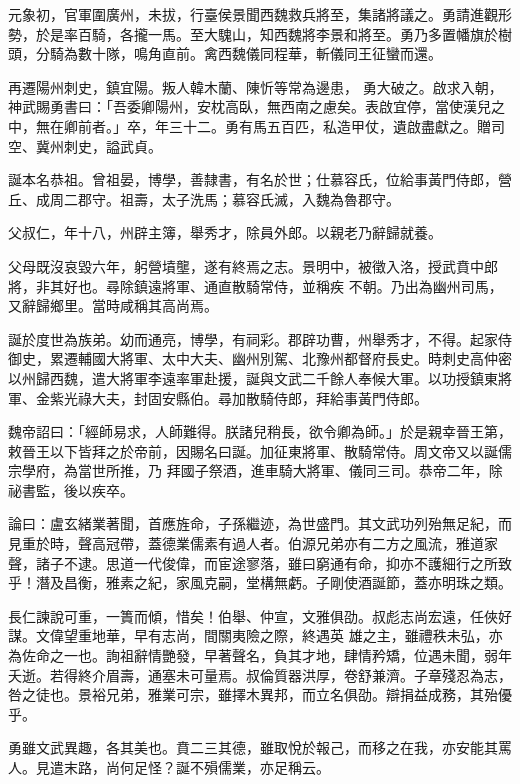 \begin{pinyinscope}
 元象初，官軍圍廣州，未拔，行臺侯景聞西魏救兵將至，集諸將議之。勇請進觀形勢，於是率百騎，各攏一馬。至大騩山，知西魏將李景和將至。勇乃多置幡旗於樹頭，分騎為數十隊，鳴角直前。禽西魏儀同程華，斬儀同王征蠻而還。



 再遷陽州刺史，鎮宜陽。叛人韓木蘭、陳忻等常為邊患，
 勇大破之。啟求入朝，神武賜勇書曰：「吾委卿陽州，安枕高臥，無西南之慮矣。表啟宜停，當使漢兒之中，無在卿前者。」卒，年三十二。勇有馬五百匹，私造甲仗，遺啟盡獻之。贈司空、冀州刺史，謚武貞。



 誕本名恭祖。曾祖晏，博學，善隸書，有名於世；仕慕容氏，位給事黃門侍郎，營丘、成周二郡守。祖壽，太子洗馬；慕容氏滅，入魏為魯郡守。



 父叔仁，年十八，州辟主簿，舉秀才，除員外郎。以親老乃辭歸就養。



 父母既沒哀毀六年，躬營墳壟，遂有終焉之志。景明中，被徵入洛，授武賁中郎將，非其好也。尋除鎮遠將軍、通直散騎常侍，並稱疾
 不朝。乃出為幽州司馬，又辭歸鄉里。當時咸稱其高尚焉。



 誕於度世為族弟。幼而通亮，博學，有祠彩。郡辟功曹，州舉秀才，不得。起家侍御史，累遷輔國大將軍、太中大夫、幽州別駕、北豫州都督府長史。時刺史高仲密以州歸西魏，遣大將軍李遠率軍赴援，誕與文武二千餘人奉候大軍。以功授鎮東將軍、金紫光祿大夫，封固安縣伯。尋加散騎侍郎，拜給事黃門侍郎。



 魏帝詔曰：「經師易求，人師難得。朕諸兒稍長，欲令卿為師。」於是親幸晉王第，敕晉王以下皆拜之於帝前，因賜名曰誕。加征東將軍、散騎常侍。周文帝又以誕儒宗學府，為當世所推，乃
 拜國子祭酒，進車騎大將軍、儀同三司。恭帝二年，除祕書監，後以疾卒。



 論曰：盧玄緒業著聞，首應旌命，子孫繼迹，為世盛門。其文武功列殆無足紀，而見重於時，聲高冠帶，蓋德業儒素有過人者。伯源兄弟亦有二方之風流，雅道家聲，諸子不逮。思道一代俊偉，而宦途寥落，雖曰窮通有命，抑亦不護細行之所致乎！潛及昌衡，雅素之紀，家風克嗣，堂構無虧。子剛使酒誕節，蓋亦明珠之類。



 長仁諫說可重，一簣而傾，惜矣！伯舉、仲宣，文雅俱劭。叔彪志尚宏遠，任俠好謀。文偉望重地華，早有志尚，間關夷險之際，終遇英
 雄之主，雖禮秩未弘，亦為佐命之一也。詢祖辭情艷發，早著聲名，負其才地，肆情矜矯，位遇未聞，弱年夭逝。若得終介眉壽，通塞未可量焉。叔倫質器洪厚，卷舒兼濟。子章殘忍為志，咎之徒也。景裕兄弟，雅業可宗，雖擇木異邦，而立名俱劭。辯捐益成務，其殆優乎。



 勇雖文武異趣，各其美也。賁二三其德，雖取悅於報己，而移之在我，亦安能其罵人。見遣末路，尚何足怪？誕不殞儒業，亦足稱云。



\end{pinyinscope}